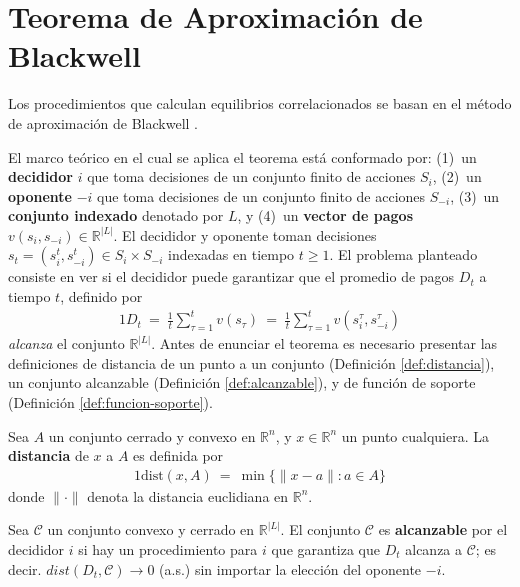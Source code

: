 \chapter{Teorema de Aproximación de Blackwell}
\label{apex:chapter:blackwell}

Los procedimientos que calculan equilibrios correlacionados se basan en el método de aproximación de Blackwell \cite{bib:correlated-equilibrium}.

El marco teórico en el cual se aplica el teorema está conformado por: (1)~un \textbf{decididor} $i$ que toma decisiones de un conjunto finito de acciones $S_i$, (2)~un \textbf{oponente} $-i$ que toma decisiones de un conjunto finito de acciones $S_{-i}$, (3)~un \textbf{conjunto indexado} denotado por $L$, y (4)~un \textbf{vector de pagos} $v(s_i, s_{-i}) \in \mathbb{R}^{|L|}$.
El decididor y oponente toman decisiones $s_t=(s^t_i,s^t_{-i})\in S_i\times S_{-i}$ indexadas en tiempo $t\geq 1$. El problema planteado consiste en ver si el decididor puede garantizar que el promedio de pagos $D_t$ a tiempo $t$, definido por
\begin{alignat}{1}
D_t\ =\ \frac{1}{t}\sum_{\tau=1}^t v(s_\tau)\ =\ \frac{1}{t}\sum_{\tau=1}^t v(s^\tau_i,s^\tau_{-i})
\end{alignat}
\emph{alcanza} el conjunto $\mathbb{R}^{|L|}$. Antes de enunciar el teorema es necesario presentar las definiciones de distancia de un punto a un conjunto (Definición \ref{def:distancia}), un conjunto alcanzable (Definición \ref{def:alcanzable}), y de función de soporte (Definición \ref{def:funcion-soporte}).

\begin{definition}
\label{def:distancia}
Sea $A$ un conjunto cerrado y convexo en $\mathbb{R}^n$, y $x \in \mathbb{R}^n$ un punto cualquiera. La \textbf{distancia} de $x$ a $A$ es definida por
\begin{alignat}{1}
\text{dist}(x, A)\ =\ \min\{ \|x - a\| : a \in A \}
\end{alignat}
donde $\|\cdot\|$ denota la distancia euclidiana en $\mathbb{R}^n$.
\end{definition}

\begin{definition}
\label{def:alcanzable}
Sea $\mathcal{C}$ un conjunto convexo y cerrado en $\mathbb{R}^{|L|}$. El conjunto $\mathcal{C}$ es \textbf{alcanzable} por el decididor $i$ si hay un procedimiento para $i$ que garantiza que $D_t$ alcanza a $\mathcal{C}$; es decir. $dist(D_t, \mathcal{C}) \rightarrow 0$ (a.s.) sin importar la elección del oponente $-i$.
\end{definition}


